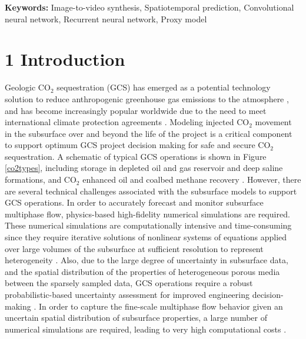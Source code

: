 \documentclass[10pt, twoside]{article}
\begin{document}
\textbf{Keywords:} Image-to-video synthesis, Spatiotemporal prediction, Convolutional neural network, Recurrent neural network, Proxy model

\section*{\textbf{1 Introduction}}
Geologic CO$_2$ sequestration (GCS) has emerged as a potential technology solution to reduce anthropogenic greenhouse gas emissions to the atmosphere \cite{Michael2010, Goodman2013329, Levine201681}, and has become increasingly popular worldwide due to the need to meet international climate protection agreements \cite{metz2005ipcc, Energy20202010EuropeanCommission, Unitednations2015AgreementP}. Modeling injected CO$_2$ movement in the subsurface over and beyond the life of the project is a critical component to support optimum GCS project decision making for safe and secure CO$_2$ sequestration. A schematic of typical GCS operations is shown in Figure \ref{co2types}, including storage in depleted oil and gas reservoir and deep saline formations, and CO$_2$ enhanced oil and coalbed methane recovery \cite{Bachu2015188, Tapia2016337, Castelletto2013570}. However, there are several technical challenges associated with the subsurface models to support GCS operations. In order to accurately forecast and monitor subsurface multiphase flow, physics-based high-fidelity numerical simulations are required. These numerical simulations are computationally intensive and time-consuming since they require iterative solutions of nonlinear systems of equations applied over large volumes of the subsurface at sufficient resolution to represent heterogeneity \cite{rustamzade2023, Rashid201321, Luo2011759, 2021AGUFM.H25O1207S}. Also, due to the large degree of uncertainty in subsurface data, and the spatial distribution of the properties of heterogeneous porous media between the sparsely sampled data, GCS operations require a robust probabilistic-based uncertainty assessment for improved engineering decision-making \cite{Chen2018, Sun2019, Chen2020}. In order to capture the fine-scale multiphase flow behavior given an uncertain spatial distribution of subsurface properties, a large number of numerical simulations are required, leading to very high computational costs \cite{Li2015389, Jiang2023}. 
\end{document}
